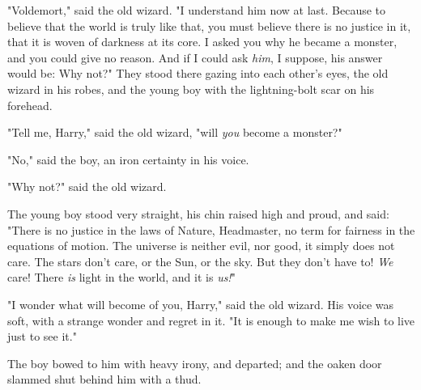 "Voldemort," said the old wizard. "I understand him now at last. Because to 
believe that the world is truly like that, you must believe there is no justice 
in it, that it is woven of darkness at its core. I asked you why he became a 
monster, and you could give no reason. And if I could ask \emph{him}, I 
suppose, his answer would be: Why not?"
\sbreak
They stood there gazing into each other's eyes, the old wizard in his robes, 
and the young boy with the lightning-bolt scar on his forehead.

"Tell me, Harry," said the old wizard, "will \emph{you} become a monster?"

"No," said the boy, an iron certainty in his voice.

"Why not?" said the old wizard.

The young boy stood very straight, his chin raised high and proud, and said: 
"There is no justice in the laws of Nature, Headmaster, no term for fairness in 
the equations of motion. The universe is neither evil, nor good, it simply does 
not care. The stars don't care, or the Sun, or the sky. But they don't have to! 
\emph{We} care! There \emph{is} light in the world, and it is \emph{us!}"

"I wonder what will become of you, Harry," said the old wizard. His voice was 
soft, with a strange wonder and regret in it. "It is enough to make me wish to 
live just to see it."

The boy bowed to him with heavy irony, and departed; and the oaken door slammed 
shut behind him with a thud.
